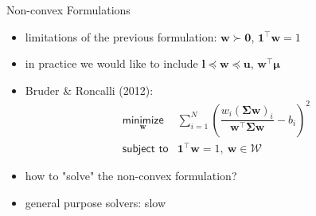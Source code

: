\documentclass[aspectratio=169]{beamer}
\begin{document}
        \begin{frame}{Non-convex Formulations}
          \vspace{.5cm}
          \begin{itemize}
            \item limitations of the previous formulation: $\bm{w} \succ \mathbf{0}$, $\mathbf{1}^\top\bm{w} = 1$
            \pause
            \vspace{.25cm}
            \item in practice we would like to include $\bm{l} \preceq \bm{w} \preceq \bm{u}$, $\bm{w}^\top\boldsymbol{\mu}$
            \pause
            \vspace{.25cm}
            \item Bruder \& Roncalli (2012):
              \begin{equation*}
              \begin{array}{ll}
                \underset{\bm{w}}{\textsf{minimize}} &
                \sum_{i=1}^{N}\left(\dfrac{w_i(\boldsymbol{\Sigma}\bm{w})_i}{\bm{w}^\top\boldsymbol{\Sigma}\bm{w}} - b_i\right)^2\\
                \textsf{subject to} & \mathbf{1}^\top\bm{w} = 1, ~\bm{w} \in \mathcal{W}
              \end{array}
              \end{equation*}
            \vspace{.25cm}
            \pause
            \item how to "solve" the non-convex formulation?
            \vspace{.25cm}
            \pause
            \item general purpose solvers: slow \Sadey
            \end{itemize}
        \end{frame}
\end{document}
